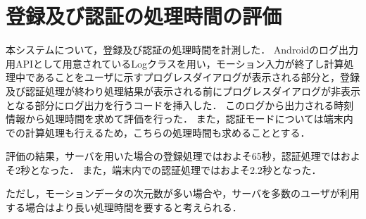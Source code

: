 \section{登録及び認証の処理時間の評価}
本システムについて，登録及び認証の処理時間を計測した．
Androidのログ出力用APIとして用意されているLogクラス\cite{5-log}を用い，モーション入力が終了し計算処理中であることをユーザに示すプログレスダイアログが表示される部分と，登録及び認証処理が終わり処理結果が表示される前にプログレスダイアログが非表示となる部分にログ出力を行うコードを挿入した．
このログから出力される時刻情報から処理時間を求めて評価を行った．
また，認証モードについては端末内での計算処理も行えるため，こちらの処理時間も求めることとする．

評価の結果，サーバを用いた場合の登録処理ではおよそ65秒，認証処理ではおよそ2秒となった．
また，端末内での認証処理ではおよそ2.2秒となった．

ただし，モーションデータの次元数が多い場合や，サーバを多数のユーザが利用する場合はより長い処理時間を要すると考えられる．
